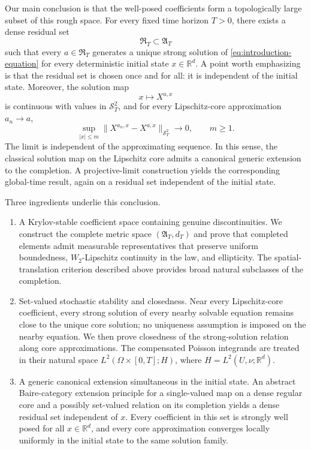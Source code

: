 \documentclass[12pt,oneside, reqno]{amsart}
\numberwithin{equation}{section}
\begin{document}
	Our main conclusion is that the well-posed coefficients form a
	topologically large subset of this rough space. For every fixed time
	horizon $T>0$, there exists a dense residual set
	\[
	\mathfrak R_T\subset\mathfrak A_T
	\]
	such that every $a\in\mathfrak R_T$ generates a unique strong solution of
	\eqref{eq:introduction-equation} for every deterministic initial state
	$x\in\mathbb R^d$. A point worth emphasizing is that the residual set is
	chosen once and for all: it is independent of the initial state. Moreover,
	the solution map
	\[
	x\longmapsto X^{a,x}
	\]
	is continuous with values in $\mathcal S_T^2$, and for every
	Lipschitz-core approximation $a_n\to a$,
	\[
	\sup_{|x|\leq m}
	\|X^{a_n,x}-X^{a,x}\|_{\mathcal S_T^2}
	\longrightarrow0,
	\qquad m\geq1.
	\]
	The limit is independent of the approximating sequence. In this sense,
	the classical solution map on the Lipschitz core admits a canonical
	generic extension to the completion. A projective-limit construction
	yields the corresponding global-time result, again on a residual set
	independent of the initial state.
	
	Three ingredients underlie this conclusion.
	\begin{enumerate}
		\item
		A Krylov-stable coefficient space containing genuine
			discontinuities.
		We construct the complete metric space $(\mathfrak A_T,d_T)$ and
		prove that completed elements admit measurable representatives that
		preserve uniform boundedness, $W_2$-Lipschitz continuity in the law,
		and ellipticity. The spatial-translation criterion described above
		provides broad natural subclasses of the completion.
		
		\item
		Set-valued stochastic stability and closedness.
		Near every Lipschitz-core coefficient, every strong solution of every
		nearby solvable equation remains close to the unique core solution;
		no uniqueness assumption is imposed on the nearby equation. We then
		prove closedness of the strong-solution relation along core
		approximations. The compensated Poisson integrands are treated in
		their natural space $L^2(\Omega\times[0,T];H)$, where
		$H=L^2(U,\nu;\mathbb R^d)$.
		
		\item
		A generic canonical extension simultaneous in the initial
			state.
		An abstract Baire-category extension principle for a single-valued
		map on a dense regular core and a possibly set-valued relation on its
		completion yields a dense residual set independent of $x$. Every
		coefficient in this set is strongly well posed for all
		$x\in\mathbb R^d$, and every core approximation converges locally
		uniformly in the initial state to the same solution family.
	\end{enumerate}
	
\end{document}
